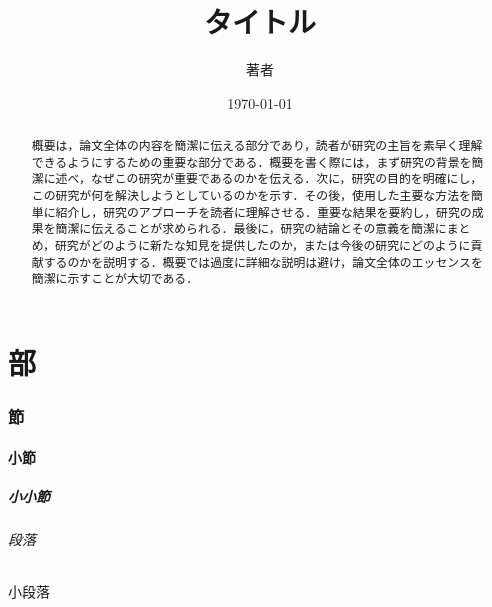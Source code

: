 \documentclass[dvipdfmx]{jsarticle} %
\title{タイトル}
\author{著者}
\date{\today}
\theoremstyle{definition} %
\begin{document}

\maketitle %

\begin{abstract} %
  概要は，論文全体の内容を簡潔に伝える部分であり，読者が研究の主旨を素早く理解できるようにするための重要な部分である．概要を書く際には，まず研究の背景を簡潔に述べ，なぜこの研究が重要であるのかを伝える．次に，研究の目的を明確にし，この研究が何を解決しようとしているのかを示す．その後，使用した主要な方法を簡単に紹介し，研究のアプローチを読者に理解させる．重要な結果を要約し，研究の成果を簡潔に伝えることが求められる．最後に，研究の結論とその意義を簡潔にまとめ，研究がどのように新たな知見を提供したのか，または今後の研究にどのように貢献するのかを説明する．概要では過度に詳細な説明は避け，論文全体のエッセンスを簡潔に示すことが大切である．
\end{abstract}

\hrulefill %

\setcounter{tocdepth}{3} %
\tableofcontents %

\newpage %



\part{部}
\section{節}
\subsection{小節}
\subsubsection{小小節}
\paragraph{段落}
\subparagraph{小段落}
\end{document}
